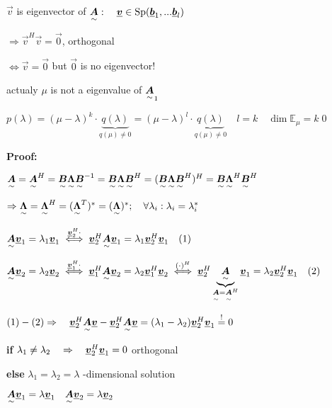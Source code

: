 $\vec{v}$ is eigenvector of $\ma{A}: \quad \vec{v}\in \Sp(\vec{b}_{1},...\vec{b}_l)$

$\Rightarrow \vec{v}^H\vec{v}=\vec{0}$, orthogonal

$\iff \vec{v}=\vec{0}$ \quad but $\vec{0}$ is no eigenvector!

actualy $\mu$ is not a eigenvalue of $\ma{A}_1$

$p(\lambda)=(\mu-\lambda)^k\cdot \underbrace{q(\lambda)}_{q(\mu)\neq0}=(\mu-\lambda)^l\cdot \underbrace{q(\lambda)}_{q(\mu)\neq0} \quad l=k\quad\dim\mathbb{E}_\mu=k$\qed



\textbf{Proof:}


$\ma{A}=\ma{A}^H=\ma{B}\ma{\Lambda}\ma{B}^{-1}=\ma{B}\ma{\Lambda}\ma{B}^{H}=(\ma{B}\ma{\Lambda}\ma{B}^{H})^{H}=\ma{B}\ma{\Lambda}^H\ma{B}^{H}$

$\Rightarrow \ma{\Lambda}=\ma{\Lambda}^H=(\ma{\Lambda}^T)^*=(\ma{\Lambda})^*; \quad \forall\lambda_i: \lambda_i=\lambda_i^*$

$\ma{A}\vec{v}_1=\lambda_1 \vec{v}_1 \overset{\vec{v}_2^H\cdot}{\iff} \vec{v}_2^H\ma{A}\vec{v}_1=\lambda_1 \vec{v}_2^H\vec{v}_1 \quad(1)$

$\ma{A}\vec{v}_2=\lambda_2 \vec{v}_2 \overset{\vec{v}_1^H\cdot}{\iff} \vec{v}_1^H\ma{A}\vec{v}_2=\lambda_2 \vec{v}_1^H\vec{v}_2 \overset{(\cdot)^H}{\iff}  \vec{v}_2^H\underbrace{\ma{A}}_{\ma{A}=\ma{A}^H}\vec{v}_1=\lambda_2 \vec{v}_2^H\vec{v}_1  \quad (2)$ 

$(1)-(2) \Rightarrow\quad \vec{v}_2^H\ma{A}\vec{v}-\vec{v}_2^H\ma{A}\vec{v}=(\lambda_1-\lambda_2)\vec{v}_2^H\vec{v}_1\overset{!}{=}0$

\textbf{if} $\lambda_1\neq\lambda_2\pfeil \vec{v}_2^H\vec{v}_1=0$ \quad orthogonal
 
\textbf{else} $\lambda_1=\lambda_2 =\lambda$ -dimensional solution

$\ma{A}\vec{v}_1=\lambda\vec{v}_1 \quad \ma{A}\vec{v}_2=\lambda\vec{v}_2$


